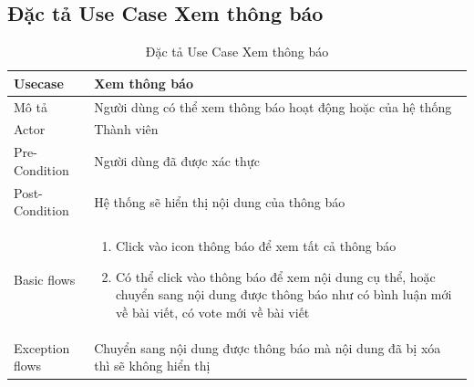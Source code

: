 \documentclass[../index.tex]{subfiles}
\begin{document}
    \subsection{Đặc tả Use Case Xem thông báo}
    \begin{table}[H]
        \centering
        {}
        \begin{tabular}{ |p{3cm}|p{9cm}| }
            \hline
            Usecase         & Xem thông báo                                                                                                                                                                                                                                       \\
            \hline
            Mô tả           & Người dùng có thể xem thông báo hoạt động hoặc của hệ thống                                                                                                                                                                                         \\
            \hline
            Actor           & Thành viên                                                                                                                                                                                                                                          \\
            \hline
            Pre-Condition   & Người dùng đã được xác thực                                                                                                                                                                                                                         \\
            \hline
            Post-Condition  & Hệ thống sẽ hiển thị nội dung của thông báo                                                                                                                                                                                                         \\
            \hline
            Basic flows     & \begin{enumerate}\item Click vào icon thông báo để xem tất cả thông báo

\item Có thể click vào thông báo để xem nội dung cụ thể, hoặc chuyển sang nội dung được thông báo như có bình luận mới về bài viết, có vote mới về bài viết\end{enumerate} \\
            \hline
            Exception flows & Chuyển sang nội dung được thông báo mà nội dung đã bị xóa thì sẽ không hiển thị                                                                                                                                                                     \\
            \hline
        \end{tabular}
        \caption{Đặc tả Use Case Xem thông báo}
    \end{table}
\end{document}
